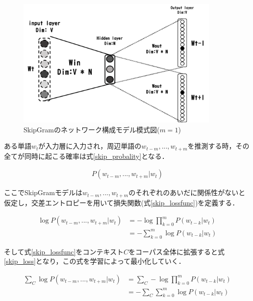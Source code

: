 \documentclass[a4j,11pt,report]{jsbook}
\begin{document}
\begin{figure}[H]
  \centering
  \includegraphics[width = 100mm]{image/SkipGram_windowsize_1.png}
  \caption{SkipGramのネットワーク構成モデル模式図($ m = 1$) }
  \label{fig:SkipGramimage}
\end{figure}



ある単語$w_{t}$が入力層に入力され，周辺単語の$w_{t-m},...,w_{t+m}$を推測する時，その全てが同時に起こる確率は式\ref{skip_probality}となる．

\begin{equation}
  \label{skip_probality}
  \begin{array}{c}
    P(w_{t-m},...,w_{t+m}|w_{t})
  \end{array}
\end{equation}

ここでSkipGramモデルは$w_{t-m},...,w_{t+m}$のそれぞれのあいだに関係性がないと仮定し，交差エントロピーを用いて損失関数(式\ref{skip_lossfunc})を定義する．

\begin{equation}
  \label{skip_lossfunc}
  \begin{split}
    \log P(w_{t-m},...,w_{t+m}|w_{t} ) &= -\log \prod_{k = 0}^m P(w_{t-k}|w_{t})   \\
    &= - \sum_{k = 0}^m \log P(w_{t-k} | w_{t})
  \end{split}
\end{equation}

そして式\ref{skip_lossfunc}をコンテキスト$C$をコーパス全体に拡張すると式\ref{skip_loss}となり，この式を学習によって最小化していく．

\begin{equation}
  \label{skip_loss}
  \begin{split}
    \sum_{C} \log P(w_{t-m},...,w_{t+m}|w_{t} ) &= \sum_{C} -\log \prod_{k = 0}^m P(w_{t-k}|w_{t})   \\
    &= - \sum_{C} \sum_{k = 0}^m \log P(w_{t-k} | w_{t})
  \end{split}
\end{equation}
\end{document}
